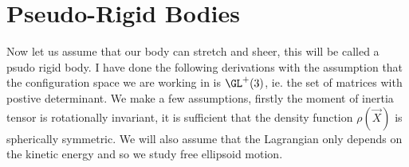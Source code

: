 
\section{Pseudo-Rigid Bodies}
Now let us assume that our body can stretch and sheer, this will be called a psudo rigid body. I have done the following derivations with the assumption that the configuration space we are working in is $\GL^+(3)$, ie. the set of matrices with postive determinant. We make a few assumptions, firstly the moment of inertia tensor is rotationally invariant, it is sufficient that the density function $\rho(\vec X)$ is spherically symmetric. We will also assume that the Lagrangian only depends on the kinetic energy and so we study free ellipsoid motion.\\

